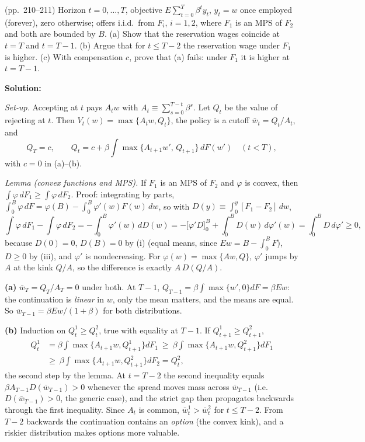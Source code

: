 \documentclass[12pt, letterpaper]{article}
\newcommand{\wb}{\bar w}
\begin{document}
\begin{tcolorbox}[evenbox,title={Exercise 6.10 \quad Finite Horizon and Mean-Preserving Spread}]
\begin{tcolorbox}[questionbox]
(pp.~210--211) Horizon $t=0,\dots,T$, objective $E\sum_{t=0}^T\beta^ty_t$, $y_t=w$ once employed (forever),
zero otherwise; offers i.i.d.\ from $F_i$, $i=1,2$, where $F_1$ is an MPS of $F_2$ and both are bounded by $B$.
(a) Show that the reservation wages coincide at $t=T$ and $t=T-1$. (b) Argue that for $t\le T-2$ the
reservation wage under $F_1$ is higher. (c) With compensation $c$, prove that (a) fails: under $F_1$ it is
higher at $t=T-1$.
\end{tcolorbox}

\textbf{Solution:}

\emph{Set-up.} Accepting at $t$ pays $A_tw$ with $A_t\equiv\sum_{s=0}^{T-t}\beta^s$. Let $Q_t$ be the value of
rejecting at $t$. Then $V_t(w)=\max\{A_tw,Q_t\}$, the policy is a cutoff $\wb_t=Q_t/A_t$, and
\[
Q_T=c,\qquad Q_t=c+\beta\int\max\{A_{t+1}w',\,Q_{t+1}\}\,dF(w')\quad(t<T),
\]
with $c=0$ in (a)--(b).

\emph{Lemma (convex functions and MPS).} If $F_1$ is an MPS of $F_2$ and $\varphi$ is convex, then
$\int\varphi\,dF_1\ge\int\varphi\,dF_2$. Proof: integrating by parts,
$\int_0^B\varphi\,dF=\varphi(B)-\int_0^B\varphi'(w)F(w)\,dw$, so with $D(y)\equiv\int_0^y[F_1-F_2]\,dw$,
\[
\int\varphi\,dF_1-\int\varphi\,dF_2=-\int_0^B\varphi'(w)\,dD(w)=-\big[\varphi'D\big]_0^B+\int_0^BD(w)\,d\varphi'(w)=\int_0^BD\,d\varphi'\ge0,
\]
because $D(0)=0$, $D(B)=0$ by (i) (equal means, since $Ew=B-\int_0^BF$), $D\ge0$ by (iii), and $\varphi'$ is
nondecreasing. For $\varphi(w)=\max\{Aw,Q\}$, $\varphi'$ jumps by $A$ at the kink $Q/A$, so the difference is
exactly $A\,D(Q/A)$.

\textbf{(a)} $\wb_T=Q_T/A_T=0$ under both. At $T-1$, $Q_{T-1}=\beta\int\max\{w',0\}dF=\beta Ew$: the
continuation is \emph{linear} in $w$, only the mean matters, and the means are equal. So
$\wb_{T-1}=\beta Ew/(1+\beta)$ for both distributions.

\textbf{(b)} Induction on $Q^1_t\ge Q^2_t$, true with equality at $T-1$. If $Q^1_{t+1}\ge Q^2_{t+1}$,
\[
\begin{aligned}Q^1_t&=\beta\int\max\{A_{t+1}w,Q^1_{t+1}\}dF_1\ \ge\ \beta\int\max\{A_{t+1}w,Q^2_{t+1}\}dF_1\\&\ge\ \beta\int\max\{A_{t+1}w,Q^2_{t+1}\}dF_2=Q^2_t,\end{aligned}
\]
the second step by the lemma. At $t=T-2$ the second inequality equals
$\beta A_{T-1}D(\wb_{T-1})>0$ whenever the spread moves mass across $\wb_{T-1}$ (i.e.\ $D(\wb_{T-1})>0$,
the generic case), and the strict gap then propagates backwards through the first inequality. Since
$A_t$ is common, $\wb^1_t>\wb^2_t$ for $t\le T-2$. From $T-2$ backwards the continuation contains an
\emph{option} (the convex kink), and a riskier distribution makes options more valuable.


\end{tcolorbox}
\end{document}
